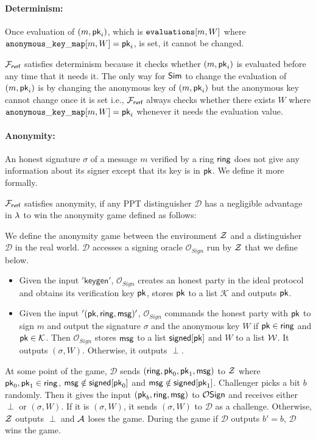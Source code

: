 \paragraph{Determinism:} Once evaluation of $ (m, \mathsf{pk}_i) $, which is $ \texttt{evaluations}[m,W] $ where $ \mathtt{anonymous\_key\_map}[m,W] = \mathsf{pk}_i $, is set, it cannot be changed. 

$ \mathcal{F}_{\textsf{rvrf}} $ satisfies determinism because it checks whether $ (m, \mathsf{pk}_i) $ is evaluated before any time that it needs it. The only way for $ \mathsf{Sim} $ to change the evaluation of $ (m, \mathsf{pk}_i) $ is by changing the anonymous key of $ (m, \mathsf{pk}_i)  $ but the anonymous key cannot change once it is set i.e., $ \mathcal{F}_{\textsf{rvrf}} $ always checks whether there exists $ W $ where $ \mathtt{anonymous\_key\_map}[m,W]  = \mathsf{pk}_i$ whenever it needs the evaluation value.

\paragraph{Anonymity:} An honest signature $ \sigma $ of a message $ m $ verified by a ring $ \mathsf{ring} $ does not give any information about its signer except that its key is in $ \mathsf{pk} $. We define it more formally.

\begin{definition}[Anonymity]\label{def:anonymity}
	$ \mathcal{F}_{\textsf{rvrf}} $ satisfies anonymity, if any PPT distinguisher $ \mathcal{D} $ has a negligible advantage in $ \lambda $ to win the anonymity game defined as follows:
	
	We define the anonymity game between the environment $ \mathcal{Z} $ and a distinguisher $ \mathcal{D} $ in the real world.  $\mathcal{D}$ accesses a signing oracle $ \mathcal{O}_{Sign} $ run by $ \mathcal{Z} $ that we define below. 
	\begin{itemize}
		\item Given the input $ '\mathsf{keygen}' $, $\mathcal{O}_{Sign} $ creates an honest party in the ideal protocol and obtains its verification key $ \mathsf{pk} $, stores $ \mathsf{pk}  $ to a list $ \mathcal{K} $ and outputs $ \mathsf{pk} $.
		\item Given the input $ '(\mathsf{pk},\mathsf{ring},\mathsf{msg})' $, $ \mathcal{O}_{Sign} $ commands the honest party with $ \mathsf{pk}$ to sign $ m $ and output the signature $ \sigma $ and the anonymous key $ W $ if $ \mathsf{pk} \in \mathsf{ring} $ and $\mathsf{pk} \in \mathcal{K}  $.  Then $ \mathcal{O}_{Sign} $ stores $ \mathsf{msg} $ to a list $ {\mathsf{signed}}[\mathsf{pk}]  $ and $ W  $ to a list $ \mathcal{W} $. It outputs $ (\sigma,W) $. Otherwise, it outputs $ \perp $.
	\end{itemize}
	At some point of the game,	
	$ \mathcal{D} $ sends $ (\mathsf{ring}, \mathsf{pk}_0, \mathsf{pk}_1, \mathsf{msg} )$ to $ \mathcal{Z} $ where $ \mathsf{pk}_0, \mathsf{pk}_1 \in \mathsf{ring} $, $ \mathsf{msg}  \notin {\ensuremath{\mathsf{signed}}}[\mathsf{pk}_0]$ and $ \mathsf{msg}  \notin {\ensuremath{\mathsf{signed}}}[\mathsf{pk}_1] $.  Challenger picks a bit $ b $ randomly. Then it gives the input $ (\mathsf{pk}_b, \mathsf{ring}, \mathsf{msg}) $ to $ \mathcal{O}\mathsf{Sign} $ and receives either $ \perp $ or $(\sigma,W)$. If it is $ (\sigma,W) $, it sends $ (\sigma,W) $ to $ \mathcal{D} $ as a challenge.
	Otherwise, $ \mathcal{Z} $ outputs $ \perp $ and $ \mathcal{A} $ loses the game.
	During the game if $ \mathcal{D} $ outputs $ b' = b $, $ \mathcal{D} $ wins the game.
	
	
\end{definition}


